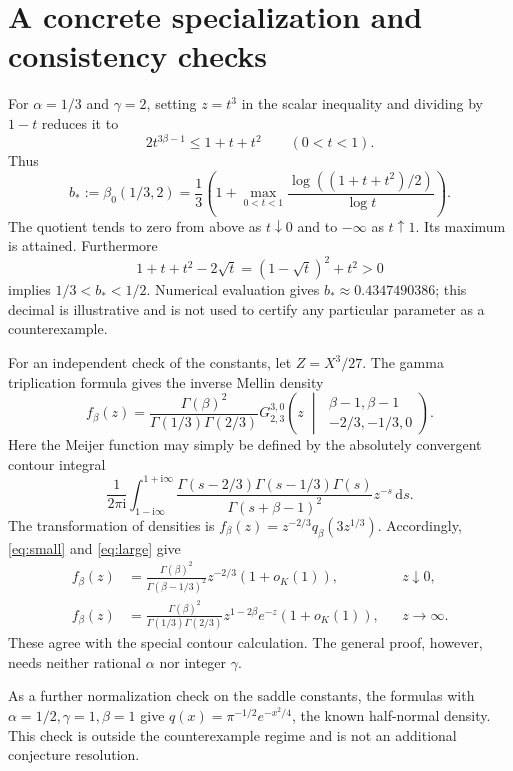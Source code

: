 \documentclass[11pt,a4paper]{article}
\numberwithin{equation}{section}
\theoremstyle{definition}\newtheorem{definition}[theorem]{Definition}
\theoremstyle{remark}\newtheorem{remark}[theorem]{Remark}
\newcommand{\ii}{\mathrm i}
\newcommand{\dd}{\,\mathrm d}
\begin{document}
\section{A concrete specialization and consistency checks}

For \(\alpha=1/3\) and \(\gamma=2\), setting \(z=t^3\) in
the scalar inequality and dividing by \(1-t\) reduces it to
\[
 2t^{3\beta-1}\le1+t+t^2\qquad(0<t<1).
\]
Thus
\begin{equation}\label{eq:bexplicit}
 b_*:=\beta_0(1/3,2)
 =\frac13\left(1+
 \max_{0<t<1}\frac{\log((1+t+t^2)/2)}{\log t}\right).
\end{equation}
The quotient tends to zero from above as \(t\downarrow0\) and
to \(-\infty\) as \(t\uparrow1\). Its maximum is attained.
Furthermore
\[
 1+t+t^2-2\sqrt t=(1-\sqrt t)^2+t^2>0
\]
implies \(1/3<b_*<1/2\). Numerical evaluation gives
\(b_*\approx0.4347490386\); this decimal is illustrative and is not
used to certify any particular parameter as a counterexample.

For an independent check of the constants, let
\(Z=X^3/27\). The gamma triplication formula gives the inverse
Mellin density
\begin{equation}\label{eq:G}
 f_\beta(z)=\frac{\Gamma(\beta)^2}{\Gamma(1/3)\Gamma(2/3)}
 G^{3,0}_{2,3}\!\left(z\;\middle|\;
 \begin{matrix}\beta-1,\beta-1\\[-2pt]-2/3,-1/3,0\end{matrix}\right).
\end{equation}
Here the Meijer function may simply be defined by the absolutely
convergent contour integral
\[
 \frac1{2\pi\ii}\int_{1-\ii\infty}^{1+\ii\infty}
 \frac{\Gamma(s-2/3)\Gamma(s-1/3)\Gamma(s)}
 {\Gamma(s+\beta-1)^2}z^{-s}\dd s.
\]
The transformation of densities is
\(f_\beta(z)=z^{-2/3}q_\beta(3z^{1/3})\). Accordingly,
\eqref{eq:small} and \eqref{eq:large} give
\begin{align}
 f_\beta(z)&=
 \frac{\Gamma(\beta)^2}{\Gamma(\beta-1/3)^2}z^{-2/3}
 (1+o_K(1)),&&z\downarrow0,\label{eq:Gsmall}\\
 f_\beta(z)&=
 \frac{\Gamma(\beta)^2}{\Gamma(1/3)\Gamma(2/3)}
 z^{1-2\beta}e^{-z}(1+o_K(1)),&&z\to\infty.
 \label{eq:Glarge}
\end{align}
These agree with the special contour calculation. The general proof,
however, needs neither rational \(\alpha\) nor integer \(\gamma\).

As a further normalization check on the saddle constants, the formulas
with \(\alpha=1/2,\gamma=1,\beta=1\) give
\(q(x)=\pi^{-1/2}e^{-x^2/4}\), the known half-normal density.
This check is outside the counterexample regime and is not an
additional conjecture resolution.
\end{document}
